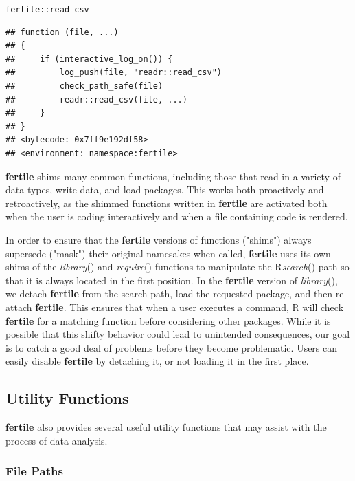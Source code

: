 \documentclass[APA,LATO1COL]{WileyNJD-v2}\usepackage[]{graphicx}\usepackage[]{color}
\makeatletter
\newcommand{\hlopt}[1]{\textcolor[rgb]{0,0,0}{#1}}%
\newcommand{\hlstd}[1]{\textcolor[rgb]{0.345,0.345,0.345}{#1}}%
\newenvironment{kframe}{%
 \def\at@end@of@kframe{}%
 \ifinner\ifhmode%
  \def\at@end@of@kframe{\end{minipage}}%
  \begin{minipage}{\columnwidth}%
 \fi\fi%
 \def\FrameCommand##1{\hskip\@totalleftmargin \hskip-\fboxsep
 \colorbox{shadecolor}{##1}\hskip-\fboxsep
     \hskip-\linewidth \hskip-\@totalleftmargin \hskip\columnwidth}%
 \MakeFramed {\advance\hsize-\width
   \@totalleftmargin\z@ \linewidth\hsize
   \@setminipage}}%
 {\par\unskip\endMakeFramed%
 \at@end@of@kframe}
\newenvironment{knitrout}{}{} %
\newcommand{\R}{\textsf{R}\xspace}
\newcommand{\pkg}[1]{\textbf{#1}}
\newcommand{\func}[1]{\textit{#1}()}
\makeatother
\begin{document}
\begin{knitrout}
\color{fgcolor}\begin{kframe}
\begin{alltt}
\hlstd{fertile}\hlopt{::}\hlstd{read_csv}
\end{alltt}
\begin{verbatim}
## function (file, ...) 
## {
##     if (interactive_log_on()) {
##         log_push(file, "readr::read_csv")
##         check_path_safe(file)
##         readr::read_csv(file, ...)
##     }
## }
## <bytecode: 0x7ff9e192df58>
## <environment: namespace:fertile>
\end{verbatim}
\end{kframe}
\end{knitrout}

\pkg{fertile} shims many common functions, including those that read in a variety of data types, write data, and load packages. This works both proactively and retroactively, as the shimmed functions written in \pkg{fertile} are activated both when the user is coding interactively and when a file containing code is rendered.

In order to ensure that the \pkg{fertile} versions of functions ("shims") always supersede ("mask") their original namesakes when called, \pkg{fertile} uses its own shims of the \func{library} and \func{require} functions to  manipulate the \R \func{search} path so that it is always located in the first position. In the \pkg{fertile} version of \func{library}, we detach \pkg{fertile} from the search path, load the requested package, and then re-attach \pkg{fertile}. This ensures that when a user executes a command, \R will check \pkg{fertile} for a matching function before considering other packages. While it is possible that this shifty behavior could lead to unintended consequences, our goal is to catch a good deal of problems before they become problematic. Users can easily disable \pkg{fertile} by detaching it, or not loading it in the first place. 


\subsection{Utility Functions}

\pkg{fertile} also provides several useful utility functions that may assist with the process of data analysis. 

\subsubsection{File Paths}
\end{document}
